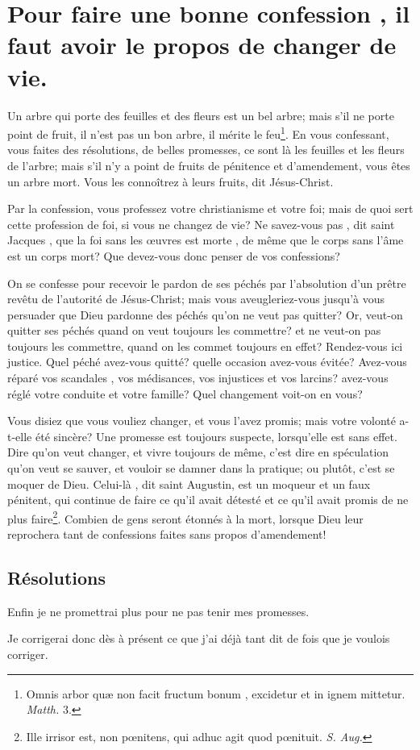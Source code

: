 \documentclass[instructions.tex]{subfiles}
\begin{document}
 
\chapter{Pour faire une bonne confession , il faut avoir le propos de changer de vie.}
 
\primo Un arbre qui porte des feuilles et des fleurs est un bel arbre; mais s'il ne porte point de fruit, il n'est pas un bon arbre, il mérite le feu\footnote{Omnis arbor quæ non facit fructum bonum , excidetur et in ignem mittetur. \textit{Matth.} 3.}. En vous confessant, vous faites des résolutions, de belles promesses, ce sont là les feuilles et les fleurs de l'arbre; mais s'il n'y a point de fruits de pénitence et d'amendement, vous êtes un arbre mort. Vous les connoîtrez à leurs fruits, dit Jésus-Christ.
 
Par la confession, vous professez votre christianisme et votre foi; mais de quoi sert cette profession de foi, si vous ne changez de vie? Ne savez-vous pas , dit saint Jacques , que la foi sans les œuvres est morte , de même que le corps sans l'âme est un corps mort? Que devez-vous donc penser de vos confessions?
 
\secundo On se confesse pour recevoir le pardon de ses péchés par l'absolution d'un prêtre revêtu de l'autorité de Jésus-Christ; mais vous aveugleriez-vous jusqu'à vous persuader que Dieu pardonne des péchés qu'on ne veut pas quitter? Or, veut-on quitter ses péchés quand on veut toujours les commettre? et ne veut-on pas toujours les commettre, quand on les commet toujours en effet? Rendez-vous ici justice. Quel péché avez-vous quitté? quelle occasion avez-vous évitée? Avez-vous réparé vos scandales , vos médisances, vos injustices et vos larcins? avez-vous réglé votre conduite et votre famille? Quel changement voit-on en vous?
 
Vous disiez que vous vouliez changer, et vous l'avez promis; mais votre volonté a-t-elle été sincère? Une promesse est toujours suspecte, lorsqu'elle est sans effet. Dire qu'on veut changer, et vivre toujours de même, c'est dire en spéculation qu'on veut se sauver, et vouloir se damner dans la pratique; ou plutôt, c'est se moquer de Dieu. Celui-là , dit saint Augustin, est un moqueur et un faux pénitent, qui continue de faire ce qu'il avait détesté et ce qu'il avait promis de ne plus faire\footnote{Ille irrisor est, non pœnitens, qui adhuc agit quod pœnituit. \textit{S. Aug.}}. Combien de gens seront étonnés à la mort, lorsque Dieu leur reprochera tant de confessions faites sans propos d'amendement!
 
\section{Résolutions}
 
\primo Enfin je ne promettrai plus pour ne pas tenir mes promesses.
 
\secundo Je corrigerai donc dès à présent ce que j'ai déjà tant dit de fois que je voulois corriger. 

 
\end{document}
